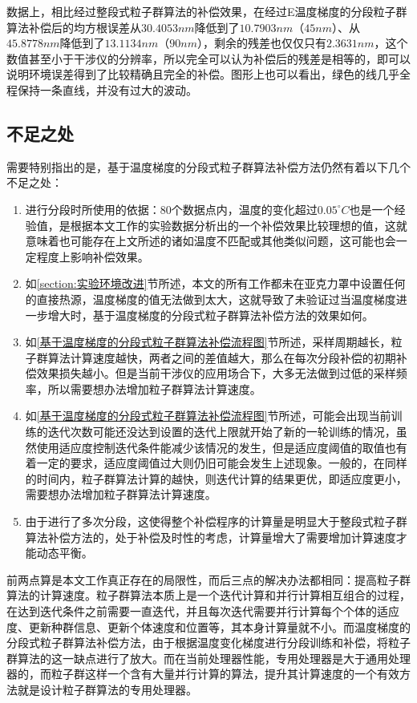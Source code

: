 数据上，相比经过整段式粒子群算法的补偿效果，在经过E温度梯度的分段粒子群算法补偿后的均方根误差从$30.4053 nm$降低到了$10.7903 nm$（$45nm$）、从$45.8778 nm$降低到了$13.1134 nm$（$90nm$），剩余的残差也仅仅只有$2.3631nm$，这个数值甚至小于干涉仪的分辨率，所以完全可以认为补偿后的残差是相等的，即可以说明环境误差得到了比较精确且完全的补偿。图形上也可以看出，绿色的线几乎全程保持一条直线，并没有过大的波动。

\subsection{不足之处}
需要特别指出的是，基于温度梯度的分段式粒子群算法补偿方法仍然有着以下几个不足之处：
\begin{enumerate}
  \item 进行分段时所使用的依据：80个数据点内，温度的变化超过$0.05^{\circ}C$也是一个经验值，是根据本文工作的实验数据分析出的一个补偿效果比较理想的值，这就意味着也可能存在上文所述的诸如温度不匹配或其他类似问题，这可能也会一定程度上影响补偿效果。
  \item 如\ref{section:实验环境改进}节所述，本文的所有工作都未在亚克力罩中设置任何的直接热源，温度梯度的值无法做到太大，这就导致了未验证过当温度梯度进一步增大时，基于温度梯度的分段式粒子群算法补偿方法的效果如何。
  \item 如\ref{基于温度梯度的分段式粒子群算法补偿流程图}节所述，采样周期越长，粒子群算法计算速度越快，两者之间的差值越大，那么在每次分段补偿的初期补偿效果损失越小。但是当前干涉仪的应用场合下，大多无法做到过低的采样频率，所以需要想办法增加粒子群算法计算速度。
  \item 如\ref{基于温度梯度的分段式粒子群算法补偿流程图}节所述，可能会出现当前训练的迭代次数可能还没达到设置的迭代上限就开始了新的一轮训练的情况，虽然使用适应度控制迭代条件能减少该情况的发生，但是适应度阈值的取值也有着一定的要求，适应度阈值过大则仍旧可能会发生上述现象。一般的，在同样的时间内，粒子群算法计算的越快，则迭代计算的结果更优，即适应度更小，需要想办法增加粒子群算法计算速度。
  \item 由于进行了多次分段，这使得整个补偿程序的计算量是明显大于整段式粒子群算法补偿方法的，处于补偿及时性的考虑，计算量增大了需要增加计算速度才能动态平衡。
\end{enumerate}

前两点算是本文工作真正存在的局限性，而后三点的解决办法都相同：提高粒子群算法的计算速度。粒子群算法本质上是一个迭代计算和并行计算相互组合的过程，在达到迭代条件之前需要一直迭代，并且每次迭代需要并行计算每个个体的适应度、更新种群信息、更新个体速度和位置等，其本身计算量就不小。而温度梯度的分段式粒子群算法补偿方法，由于根据温度变化梯度进行分段训练和补偿，将粒子群算法的这一缺点进行了放大。而在当前处理器性能，专用处理器是大于通用处理器的，而粒子群这样一个含有大量并行计算的算法，提升其计算速度的一个有效方法就是设计粒子群算法的专用处理器。

